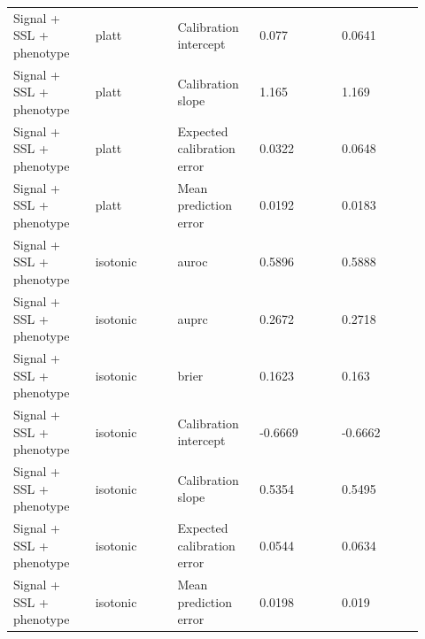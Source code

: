 \documentclass[11pt]{article}
\begin{document}
\begin{landscape}
\begin{longtable}{L{0.184\linewidth} L{0.184\linewidth} L{0.184\linewidth} L{0.184\linewidth} L{0.184\linewidth}}
Signal + SSL + phenotype & platt & Calibration intercept & 0.\allowbreak{}077 & 0.\allowbreak{}0641 \\
Signal + SSL + phenotype & platt & Calibration slope & 1.\allowbreak{}165 & 1.\allowbreak{}169 \\
Signal + SSL + phenotype & platt & Expected calibration error & 0.\allowbreak{}0322 & 0.\allowbreak{}0648 \\
Signal + SSL + phenotype & platt & Mean prediction error & 0.\allowbreak{}0192 & 0.\allowbreak{}0183 \\
Signal + SSL + phenotype & isotonic & auroc & 0.\allowbreak{}5896 & 0.\allowbreak{}5888 \\
Signal + SSL + phenotype & isotonic & auprc & 0.\allowbreak{}2672 & 0.\allowbreak{}2718 \\
Signal + SSL + phenotype & isotonic & brier & 0.\allowbreak{}1623 & 0.\allowbreak{}163 \\
Signal + SSL + phenotype & isotonic & Calibration intercept & -\allowbreak{}0.\allowbreak{}6669 & -\allowbreak{}0.\allowbreak{}6662 \\
Signal + SSL + phenotype & isotonic & Calibration slope & 0.\allowbreak{}5354 & 0.\allowbreak{}5495 \\
Signal + SSL + phenotype & isotonic & Expected calibration error & 0.\allowbreak{}0544 & 0.\allowbreak{}0634 \\
Signal + SSL + phenotype & isotonic & Mean prediction error & 0.\allowbreak{}0198 & 0.\allowbreak{}019 \\
\end{longtable}
\normalsize
\end{landscape}
\end{document}
